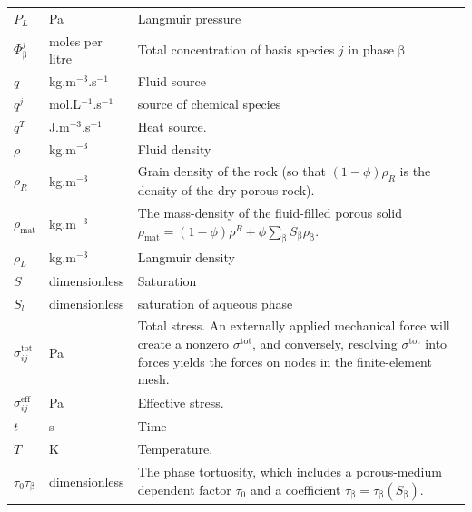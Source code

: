 \documentclass[12pt]{report}
\def\phase{\mathrm{\beta}}
\begin{document}
\begin{longtable}{llp{10cm}}
$P_{L}$ & Pa & Langmuir pressure \\

$\Phi_{\phase}^{j}$ & moles per litre & Total concentration of basis
species $j$ in phase $\phase$ \\

$q$ & kg.m$^{-3}$.s$^{-1}$ & Fluid source \\

$q^{j}$ & mol.L$^{-1}$.s$^{-1}$ & source of chemical species \\

$q^{T}$ & J.m$^{-3}$.s$^{-1}$ & Heat source. \\

$\rho$ & kg.m$^{-3}$ & Fluid density \\

$\rho_{R}$ & kg.m$^{-3}$ & Grain density of the rock (so that
$(1-\phi)\rho_{R}$ is the density of the dry porous rock). \\

$\rho_{\mathrm{mat}}$ & kg.m$^{-3}$ & The mass-density of the
fluid-filled porous solid $\rho_{\mathrm{mat}} = (1 - \phi)\rho^{R} +
\phi\sum_{\phase}S_{\phase}\rho_{\phase}$. \\

$\rho_{L}$ & kg.m$^{-3}$ & Langmuir density\\

$S$ & dimensionless & Saturation \\

$S_{l}$ & dimensionless & saturation of aqueous phase \\


$\sigma^{\mathrm{tot}}_{ij}$ & Pa & Total stress.  An
externally applied mechanical force will create a nonzero
$\sigma^{\mathrm{tot}}$, and conversely, resolving
$\sigma^{\mathrm{tot}}$ into forces yields the forces on nodes in the
finite-element mesh. \\

$\sigma^{\mathrm{eff}}_{ij}$ & Pa & Effective stress. \\

$t$ & s & Time \\

$T$ & K & Temperature. \\

$\tau_{0}\tau_{\phase}$ & dimensionless & The phase tortuosity, which
includes a porous-medium dependent factor $\tau_{0}$ and a coefficient
$\tau_{\phase}=\tau_{\phase}(S_{\phase})$. \\


\end{longtable}
\end{document}
